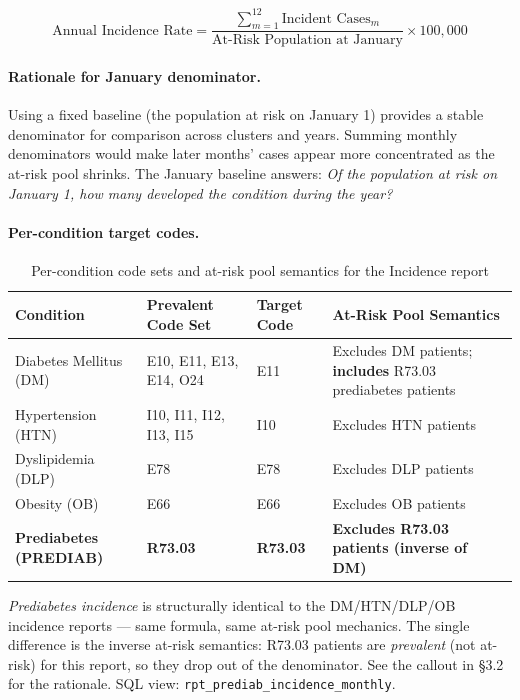 \documentclass[11pt,a4paper]{article}
\begin{document}
\begin{equation}
\text{Annual Incidence Rate} =
\frac{\sum_{m=1}^{12} \text{Incident Cases}_m}
     {\text{At-Risk Population at January}} \times 100{,}000
\end{equation}

\paragraph{Rationale for January denominator.}
Using a fixed baseline (the population at risk on January 1) provides a stable denominator for comparison across clusters and years. Summing monthly denominators would make later months' cases appear more concentrated as the at-risk pool shrinks. The January baseline answers: \textit{Of the population at risk on January 1, how many developed the condition during the year?}

\paragraph{Per-condition target codes.}
\begin{table}[ht]
\centering\small
\caption{Per-condition code sets and at-risk pool semantics for the Incidence report}
\begin{tabular}{@{}p{} p{} p{} p{}@{}}
\toprule
\textbf{Condition} & \textbf{Prevalent Code Set} & \textbf{Target Code} & \textbf{At-Risk Pool Semantics} \\
\midrule
Diabetes Mellitus (DM) & E10, E11, E13, E14, O24 & E11 & Excludes DM patients; \textbf{includes} R73.03 prediabetes patients \\
Hypertension (HTN) & I10, I11, I12, I13, I15 & I10 & Excludes HTN patients \\
Dyslipidemia (DLP) & E78 & E78 & Excludes DLP patients \\
Obesity (OB) & E66 & E66 & Excludes OB patients \\
\textbf{Prediabetes (PREDIAB)} & \textbf{R73.03} & \textbf{R73.03} & \textbf{Excludes R73.03 patients (inverse of DM)} \\
\bottomrule
\end{tabular}
\end{table}

\textit{Prediabetes incidence} is structurally identical to the DM/HTN/DLP/OB incidence reports — same formula, same at-risk pool mechanics. The single difference is the inverse at-risk semantics: R73.03 patients are \emph{prevalent} (not at-risk) for this report, so they drop out of the denominator. See the callout in §3.2 for the rationale. SQL view: \texttt{rpt\_prediab\_incidence\_monthly}.
\end{document}
